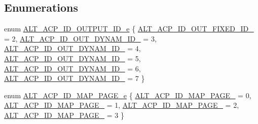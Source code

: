 \subsection*{Enumerations}
\begin{DoxyCompactItemize}
\item 
enum \mbox{\hyperlink{group__ADDR__SPACE__MGR__MEM__COHERENCE_ga4f1a98efabe5d8fcfcddf0e2da731d0a}{A\+L\+T\+\_\+\+A\+C\+P\+\_\+\+I\+D\+\_\+\+O\+U\+T\+P\+U\+T\+\_\+\+I\+D\+\_\+e}} \{ \newline
\mbox{\hyperlink{group__ADDR__SPACE__MGR__MEM__COHERENCE_gga4f1a98efabe5d8fcfcddf0e2da731d0aa23bc58c357416bc2c8cb07ae441077f0}{A\+L\+T\+\_\+\+A\+C\+P\+\_\+\+I\+D\+\_\+\+O\+U\+T\+\_\+\+F\+I\+X\+E\+D\+\_\+\+I\+D\+\_}} = 2, 
\mbox{\hyperlink{group__ADDR__SPACE__MGR__MEM__COHERENCE_gga4f1a98efabe5d8fcfcddf0e2da731d0aafbef3199782e77a06de0297ce206f6b1}{A\+L\+T\+\_\+\+A\+C\+P\+\_\+\+I\+D\+\_\+\+O\+U\+T\+\_\+\+D\+Y\+N\+A\+M\+\_\+\+I\+D\+\_}} = 3, 
\mbox{\hyperlink{group__ADDR__SPACE__MGR__MEM__COHERENCE_gga4f1a98efabe5d8fcfcddf0e2da731d0aae1a9a778a8301220e9c9e7a7ef46711a}{A\+L\+T\+\_\+\+A\+C\+P\+\_\+\+I\+D\+\_\+\+O\+U\+T\+\_\+\+D\+Y\+N\+A\+M\+\_\+\+I\+D\+\_}} = 4, 
\mbox{\hyperlink{group__ADDR__SPACE__MGR__MEM__COHERENCE_gga4f1a98efabe5d8fcfcddf0e2da731d0aa91c971a5bba55f969b5b8301b1ead002}{A\+L\+T\+\_\+\+A\+C\+P\+\_\+\+I\+D\+\_\+\+O\+U\+T\+\_\+\+D\+Y\+N\+A\+M\+\_\+\+I\+D\+\_}} = 5, 
\newline
\mbox{\hyperlink{group__ADDR__SPACE__MGR__MEM__COHERENCE_gga4f1a98efabe5d8fcfcddf0e2da731d0aafe4992790595227843c845810c6ba834}{A\+L\+T\+\_\+\+A\+C\+P\+\_\+\+I\+D\+\_\+\+O\+U\+T\+\_\+\+D\+Y\+N\+A\+M\+\_\+\+I\+D\+\_}} = 6, 
\mbox{\hyperlink{group__ADDR__SPACE__MGR__MEM__COHERENCE_gga4f1a98efabe5d8fcfcddf0e2da731d0aaede5f1e31e9d9dedfa57f04072d2ac61}{A\+L\+T\+\_\+\+A\+C\+P\+\_\+\+I\+D\+\_\+\+O\+U\+T\+\_\+\+D\+Y\+N\+A\+M\+\_\+\+I\+D\+\_}} = 7
 \}
\item 
enum \mbox{\hyperlink{group__ADDR__SPACE__MGR__MEM__COHERENCE_gadd781c359099569d3053f323121d3dd0}{A\+L\+T\+\_\+\+A\+C\+P\+\_\+\+I\+D\+\_\+\+M\+A\+P\+\_\+\+P\+A\+G\+E\+\_\+e}} \{ \mbox{\hyperlink{group__ADDR__SPACE__MGR__MEM__COHERENCE_ggadd781c359099569d3053f323121d3dd0a25898fb6e1cde7068c1d71c100c7e264}{A\+L\+T\+\_\+\+A\+C\+P\+\_\+\+I\+D\+\_\+\+M\+A\+P\+\_\+\+P\+A\+G\+E\+\_}} = 0, 
\mbox{\hyperlink{group__ADDR__SPACE__MGR__MEM__COHERENCE_ggadd781c359099569d3053f323121d3dd0a0e9e2a36cfee7589742d06c1c2499dec}{A\+L\+T\+\_\+\+A\+C\+P\+\_\+\+I\+D\+\_\+\+M\+A\+P\+\_\+\+P\+A\+G\+E\+\_}} = 1, 
\mbox{\hyperlink{group__ADDR__SPACE__MGR__MEM__COHERENCE_ggadd781c359099569d3053f323121d3dd0a741e52e8935ae4ade9f23606ea305294}{A\+L\+T\+\_\+\+A\+C\+P\+\_\+\+I\+D\+\_\+\+M\+A\+P\+\_\+\+P\+A\+G\+E\+\_}} = 2, 
\mbox{\hyperlink{group__ADDR__SPACE__MGR__MEM__COHERENCE_ggadd781c359099569d3053f323121d3dd0af7bbb815ce38a6d3bc89a0124b6633e4}{A\+L\+T\+\_\+\+A\+C\+P\+\_\+\+I\+D\+\_\+\+M\+A\+P\+\_\+\+P\+A\+G\+E\+\_}} = 3
 \}
\end{DoxyCompactItemize}
